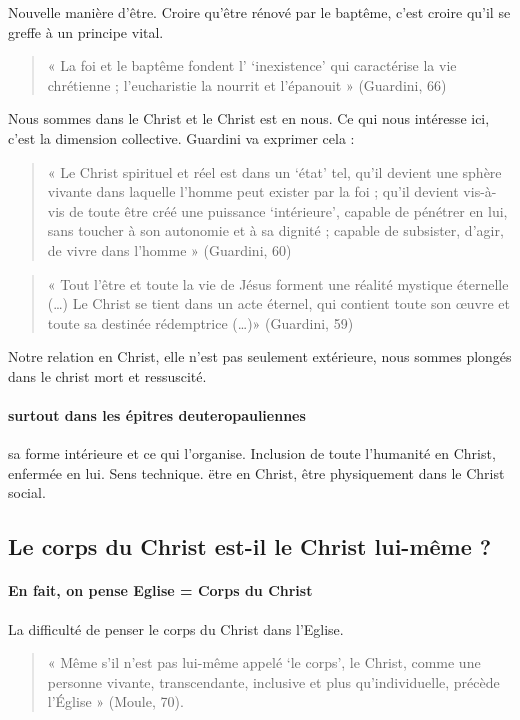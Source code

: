  
  Nouvelle manière d'être. Croire qu'être rénové par le baptême, c'est croire qu'il se greffe à un principe vital. \begin{quote}
      « La foi et le baptême fondent l’ ‘inexistence’ qui caractérise la vie chrétienne ; l’eucharistie la nourrit et l’épanouit » (Guardini, 66)
 \end{quote}
  
  Nous sommes dans le Christ et le Christ est en nous. Ce qui nous intéresse ici, c'est la dimension collective.  Guardini va exprimer cela : 
  \begin{quote}
     « Le Christ spirituel et réel est dans un ‘état’ tel, qu’il devient une sphère vivante dans laquelle l’homme peut exister par la foi ; qu’il devient vis-à-vis de toute être créé une puissance ‘intérieure’, capable de pénétrer en lui, sans toucher à son autonomie et à sa dignité ; capable de subsister, d’agir, de vivre dans l’homme » (Guardini, 60)
 \end{quote} 
 
 
 \begin{quote}
     « Tout l’être et toute la vie de Jésus forment une réalité mystique éternelle (…) Le Christ se tient dans un acte éternel, qui contient toute son œuvre et toute sa destinée rédemptrice (…)» (Guardini, 59)
 \end{quote}
 Notre relation en Christ, elle n'est pas seulement extérieure, nous sommes plongés dans le christ mort et ressuscité.
 
 \paragraph{surtout dans les épitres deuteropauliennes} sa forme intérieure et ce qui l'organise. Inclusion de toute l'humanité en Christ, enfermée en lui. Sens technique. ëtre en Christ, être physiquement dans le Christ social. 
 
 
 \subsection{Le corps du Christ est-il le Christ lui-même ?}
 
 \paragraph{En fait, on pense Eglise = Corps du Christ} 
 La difficulté de penser le corps du Christ dans l'Eglise. 

 
 \begin{quote}
     « Même s’il n’est pas lui-même appelé ‘le corps’, le Christ, comme une personne vivante, transcendante, inclusive et plus qu’individuelle, précède l’Église » (Moule, 70).
 \end{quote}
 

